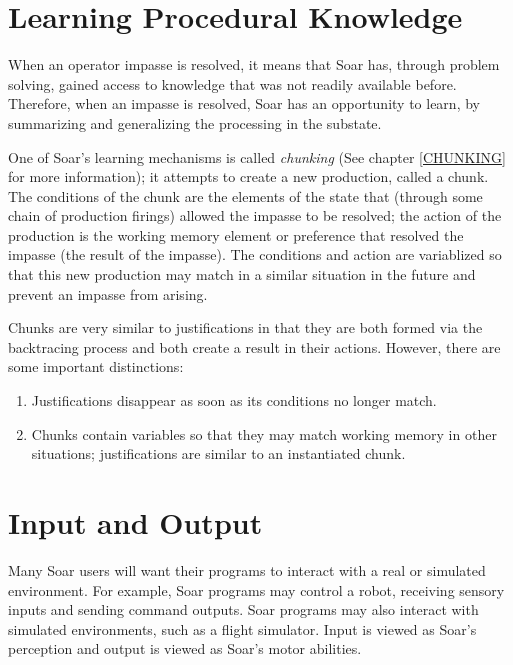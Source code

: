 \section{Learning Procedural Knowledge}
\label{ARCH-learning} 

When an operator impasse is resolved, it means that Soar has, through problem 
solving, gained access to knowledge that was not readily available before. Therefore,
when an impasse is resolved, Soar has an opportunity to learn, by summarizing
and generalizing the processing in the substate.

One of Soar's learning mechanisms is called \textit{chunking} 
(See chapter \ref{CHUNKING} for more information); it attempts to
create a new production, called a chunk. The conditions of 
the chunk are the elements of the state that (through some chain of 
production firings) allowed the impasse to be resolved; the action of the 
production is the working memory element or preference that resolved the impasse
(the result of the impasse). The conditions and action are variablized so that this
new production may match in a similar situation in the future and
prevent an impasse from arising. 

Chunks are very similar to justifications in that they are both
formed via the backtracing process and both create a result in their
actions. However, there are some important distinctions:
\vspace{-12pt}

\begin{enumerate}
\item Justifications disappear as soon as its conditions no longer match. 
\vspace{-8pt}
\item Chunks contain variables so that they may match working memory in other situations; justifications are similar to an instantiated chunk.
\end{enumerate}




\section{Input and Output}
\label{ARCH-io}	%

Many Soar users will want their programs to interact with a real or simulated
environment. For example, Soar programs may control a robot, receiving sensory
inputs and sending command outputs. Soar programs may also interact with
simulated environments, such as a flight simulator. Input is viewed as
Soar's perception and output is viewed as Soar's motor abilities.

